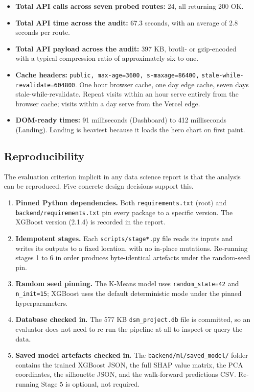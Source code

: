 \begin{itemize}
\item \textbf{Total API calls across seven probed routes:} 24, all
  returning 200 OK.
\item \textbf{Total API time across the audit:} 67.3 seconds, with an
  average of 2.8 seconds per route.
\item \textbf{Total API payload across the audit:} 397 KB,
  brotli- or gzip-encoded with a typical compression ratio of
  approximately six to one.
\item \textbf{Cache headers:}
  \texttt{public, max-age=3600, s-maxage=86400,}
  \texttt{stale-while-revalidate=604800}. One hour browser cache,
  one day edge cache, seven days stale-while-revalidate. Repeat
  visits within an hour serve entirely from the browser cache; visits
  within a day serve from the Vercel edge.
\item \textbf{DOM-ready times:} 91 milliseconds (Dashboard) to 412
  milliseconds (Landing). Landing is heaviest because it loads the
  hero chart on first paint.
\end{itemize}

\subsection{Reproducibility}

The evaluation criterion implicit in any data science report is that
the analysis can be reproduced. Five concrete design decisions
support this.

\begin{enumerate}
\item \textbf{Pinned Python dependencies.} Both
  \texttt{requirements.txt} (root) and
  \texttt{backend/requirements.txt} pin every package to a specific
  version. The XGBoost version (2.1.4) is recorded in the report.
\item \textbf{Idempotent stages.} Each \texttt{scripts/stage*.py} file reads
  its inputs and writes its outputs to a fixed location, with no
  in-place mutations. Re-running stages 1 to 6 in order produces
  byte-identical artefacts under the random-seed pin.
\item \textbf{Random seed pinning.} The K-Means model uses
  \texttt{random\_state=42} and \texttt{n\_init=15}; XGBoost uses the
  default deterministic mode under the pinned hyperparameters.
\item \textbf{Database checked in.} The 577 KB \texttt{dsm\_project.db}
  file is committed, so an evaluator does not need to re-run the
  pipeline at all to inspect or query the data.
\item \textbf{Saved model artefacts checked in.} The
  \texttt{backend/ml/saved\_model/} folder contains the trained
  XGBoost JSON, the full SHAP value matrix, the PCA coordinates, the
  silhouette JSON, and the walk-forward predictions CSV. Re-running
  Stage 5 is optional, not required.
\end{enumerate}

